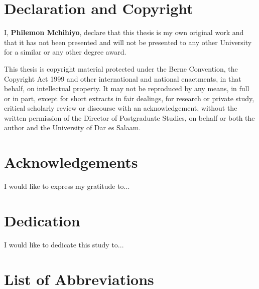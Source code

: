 \documentclass[a4paper, 12pt]{report}
\begin{document}
\vspace{3cm}
\noindent
{}

\chapter*{Declaration and Copyright}

I, \textbf{Philemon Mchihiyo}, declare that this thesis is my own original work and that it has not been presented and will not be presented to any other University for a similar or any other degree award.

\vspace{4cm}
\noindent
{}

\vspace{3cm}
\noindent
\justify
This thesis is copyright material protected under the Berne Convention, the Copyright Act 1999 and other international and national enactments, in that behalf, on intellectual property. It may not be reproduced by any means, in full or in part, except for short extracts in fair dealings, for research or private study, critical scholarly review or discourse with an acknowledgement, without the written permission of the Director of Postgraduate Studies, on behalf or both the author and the University of Dar es Salaam.

\chapter*{Acknowledgements}

I would like to express my gratitude to...

\chapter*{Dedication}

I would like to dedicate this study to...

\chapter*{List of Abbreviations}
\end{document}
